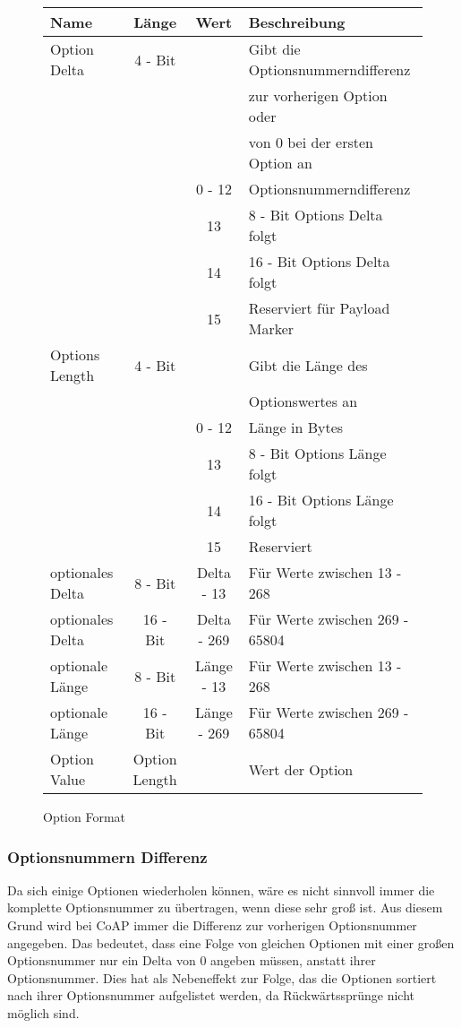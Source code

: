 \begin{figure}[htbp]
    \centering
    \begin{minipage}{0.75\textwidth}
    
    \end{minipage}
\begin{center}
\begin{tabular}{l|c|c|l}
    Name & Länge & Wert & Beschreibung \\
    \hline
    Option Delta & 4 - Bit &  & Gibt die Optionsnummerndifferenz\\
                            &&&zur vorherigen Option oder\\
                            &&&von 0 bei der ersten Option an\\
                 &       &0 - 12& Optionsnummerndifferenz\\
                 &       &13& 8 - Bit Options Delta folgt\\
                 &       &14& 16 - Bit Options Delta folgt\\
                 &       &15& Reserviert für Payload Marker\\
    \hline
    Options Length & 4 - Bit &  & Gibt die Länge des\\ 
                            &&&Optionswertes an\\
                 &       &0 - 12& Länge in Bytes\\
                 &       &13& 8 - Bit Options Länge folgt\\
                 &       &14& 16 - Bit Options Länge folgt\\
                 &       &15& Reserviert\\
    \hline
    optionales Delta& 8 - Bit  &Delta - 13& Für Werte zwischen 13 - 268 \\
    \hline
    optionales Delta& 16 - Bit &Delta - 269& Für Werte zwischen 269 - 65804\\    
    \hline
    optionale Länge& 8 - Bit  &Länge - 13& Für Werte zwischen 13 - 268  \\
    \hline
    optionale Länge& 16 - Bit &Länge - 269& Für Werte zwischen 269 - 65804\\
    \hline
    Option Value &Option Length&& Wert der Option
\end{tabular}
\end{center}
\caption{Option Format}
\label{fig:optionformat}
\end{figure}
\subsubsection{Optionsnummern Differenz}
\label{optiondelta}
Da sich einige Optionen wiederholen können, wäre es nicht sinnvoll immer die komplette Optionsnummer
zu übertragen, wenn diese sehr groß ist.
Aus diesem Grund wird bei \ac{CoAP} immer die Differenz zur vorherigen Optionsnummer angegeben.
Das bedeutet, dass eine Folge von gleichen Optionen mit einer großen Optionsnummer nur ein Delta von 0
angeben müssen, anstatt ihrer Optionsnummer.
Dies hat als Nebeneffekt zur Folge, das die Optionen sortiert nach ihrer Optionsnummer aufgelistet
werden, da Rückwärtssprünge nicht möglich sind.

